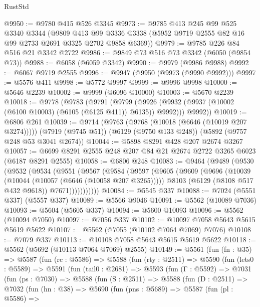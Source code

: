 \begin{lexlean}{RustStd}
\begin{coremodule}
@9950 := @9780 @415 @526 @3345
@9973 := @9785
    @413
    @245
    @99
    @525
    @3340
    @3344
    (@9809 @413 @99 @3336 @3338 (@5952 @9719 @2555 @82 @16 @99 @2733 @2691 @3325 @2702 @9858 @6369))
@9979 := @9785 @226 @84 @516 @21 @3342 @2722
@9986 := @9849 @73 @516 @73 @3342 (@6050 (@9854 @73))
@9988 := @6058 (@6059 @3342)
@9990 := @9979 (@9986 @9988)
@9992 := @6067 @9719 @2555
@9996 := @9947 (@9950 (@9973 (@9990 @9992)))
@9997 := @5576 @411
@9998 := @5772 @9997
@9999 := @9996 @9998
@10000 := @5646 @2239
@10002 := @9999 (@6096 @10000)
@10003 := @5670 @2239
@10018 := @9778
    (@9783
      (@9791
        (@9799 (@9926 (@9932 (@9937 (@10002 (@6100 @10003) (@6105 (@6125 @411)) @6135)) @9992)))
        @9992))
@10019 := @6806 @261
@10039 := @9714
    (@9763 (@9768 (@10018 (@6646 (@10019 @207 @3274)))))
    (@7919 (@9745 @51))
    (@6129 (@9750 @133 @248))
    (@5892 (@9757 @248 @53 @3041 @2674))
@10044 := @5898 @8291 @428 @207 @2674 @3267
@10057 := @6699 @8291 @2555 @248 @207 @84 @21 @2674 @2722 @3265 @6023 (@6187 @8291 @2555)
@10058 := @6806 @248
@10083 := @9464
    (@9489
      (@9530
        (@9532
          (@9534
            (@9551
              (@9567
                (@9584
                  (@9597
                    (@9605
                      (@9609
                        (@9696
                          (@10039 (@10044 (@10057 (@6646 (@10058 @207 @3265)))))
                          @8103
                          (@6129 (@8108 @517 @432 @9618))
                          @7671)))))))))))
@10084 := @5545 @337
@10088 := @7024 (@5551 @337) (@5557 @337)
@10089 := @5566 @9046
@10091 := @5562 (@10089 @7036)
@10093 := @5604 (@5605 @337)
@10094 := @5600 @10093
@10096 := @5562 (@10094 @7050)
@10097 := @7056 @337
@10102 := @10097 @7058 @5643 @5615 @5619 @5622
@10107 := @5562 (@7055 (@10102 @7064 @7069) @7076)
@10108 := @7079 @337
@10113 := @10108 @7058 @5643 @5615 @5619 @5622
@10118 := @5562 (@5692 (@10113 @7064 @7069) @2555)
@10149 := @5561
    (fun (fn : @35) =>
    @5587
      (fun (rc : @5586) =>
      @5588
        (fun (rty : @2511) =>
        @5590
          (fun (lets0 : @5589) =>
          @5591
            (fun (tail0 : @2681) =>
            @5593
              (fun (Γ : @5592) =>
              @7031
                (fun (ps : @7030) =>
                @5588
                  (fun (S : @2511) =>
                  @5588
                    (fun (D : @2511) =>
                    @7032
                      (fun (hn : @38) =>
                      @5690
                        (fun (pns : @5689) =>
                        @5587
                          (fun (pl : @5586) =>

\end{coremodule}
\end{lexlean}
